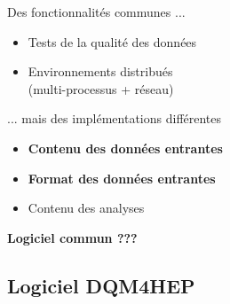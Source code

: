 \documentclass[8pt]{beamer}
\begin{document}
\begin{frame}
\begin{minipage}{0.47\linewidth}
\begin{block}{Des fonctionnalités communes ...}
\begin{itemize}
            \item Tests de la qualité des données
            \item Environnements distribués \\(multi-processus + réseau)
          \end{itemize}
        \end{block}
      \end{minipage} \hfill
      \begin{minipage}{0.47\linewidth}
        \pause
        \begin{block}{... mais des implémentations différentes}
          \begin{itemize}
            \item \textbf{Contenu des données entrantes}
            \item \textbf{Format des données entrantes}
            \item Contenu des analyses
          \end{itemize}
        \end{block}
      \end{minipage}
      \pause
      \begin{center} \textbf{Logiciel commun ???} \end{center}
    \end{frame}


    \subsection{Logiciel DQM4HEP}
\end{document}
